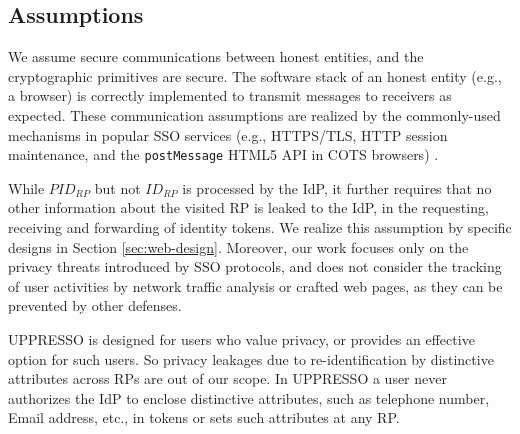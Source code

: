 \subsection{Assumptions}
We assume secure communications between honest entities, and the cryptographic primitives are secure. The software stack of an honest entity (e.g., a browser) is correctly implemented to transmit messages to receivers as expected.
These communication assumptions are realized by the commonly-used mechanisms in popular SSO services
 (e.g., HTTPS/TLS, HTTP session maintenance, and the \verb+postMessage+ HTML5 API in COTS browsers) \cite{OpenIDConnect, rfc6749, SAML,GoogleIdIntegrate,de2014oauth,FettKS14,BrowserID,uber}.

While $PID_{RP}$ but not $ID_{RP}$ is processed by the IdP,
it further requires that no other information about the visited RP is leaked to the IdP,
 in the requesting, receiving and forwarding of identity tokens.
We realize this assumption by specific designs in Section \ref{sec:web-design}.
Moreover, our work focuses only on the privacy threats introduced by SSO protocols, and does not consider the tracking of user activities by network traffic analysis or crafted web pages, as they can be prevented by other defenses.


UPPRESSO is designed for users who value privacy,
        or provides an effective option for such users.
So privacy leakages due to re-identification by distinctive attributes across RPs are out of our scope.
In UPPRESSO a user never authorizes the IdP to enclose distinctive attributes, such as telephone number, Email address, etc., in tokens or sets such attributes at any RP.
